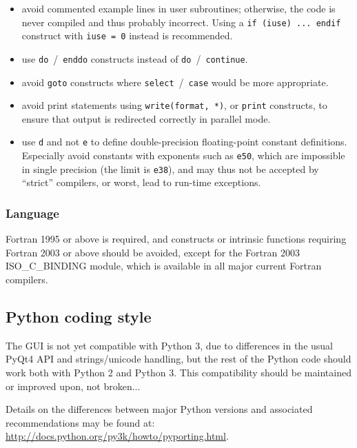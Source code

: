 \begin{itemize}
\item avoid commented example lines in user subroutines; otherwise,
      the code is never compiled and thus probably incorrect.
      Using a \texttt{if (iuse) ... endif} construct with
      \texttt{iuse = 0} instead is recommended.

\item use \texttt{do}~/~\texttt{enddo} constructs instead of
      \texttt{do}~/~\texttt{continue}.

\item avoid \texttt{goto} constructs where \texttt{select}~/~\texttt{case}
      would be more appropriate.

\item avoid print statements using \texttt{write(format, *)},
      or \texttt{print} constructs, to ensure that output is redirected
      correctly in parallel mode.

\item use \texttt{d} and not \texttt{e} to define double-precision
      floating-point constant definitions. Especially avoid
      constants with exponents such as \texttt{e50}, which are impossible
      in single precision (the limit is \texttt{e38}), and may thus not
      be accepted by ``strict'' compilers, or worst, lead to run-time
      exceptions.

\end{itemize}

\subsubsection{Language\label{sec:regle.lang}}

Fortran 1995 or above is required, and constructs or intrinsic functions
requiring Fortran 2003 or above should be avoided, except for the
Fortran 2003 ISO\_C\_BINDING module, which is available in all major
current Fortran compilers.

\subsection{Python coding style}

The GUI is not yet compatible with Python 3, due to differences in the
usual PyQt4 API and strings/unicode handling, but the rest of the Python code
should work both with Python 2 and Python 3.
This compatibility should be maintained or improved upon, not broken...

Details on the differences between major Python versions and associated
recommendations may be found at:
\url{http://docs.python.org/py3k/howto/pyporting.html}.
